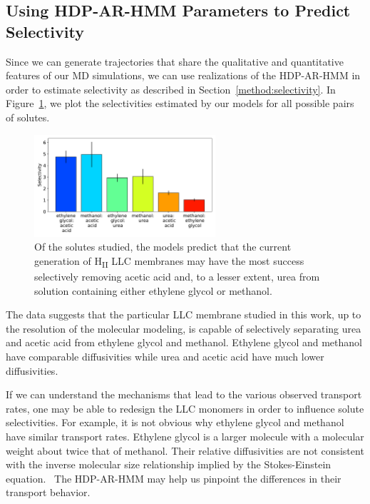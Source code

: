 \documentclass[journal=jpcbfk,manuscript=article]{achemso}
\begin{document}
  \subsection{Using HDP-AR-HMM Parameters to Predict Selectivity}\label{section:macroscopic_properties}
  
  Since we can generate trajectories that share the qualitative and quantitative
  features of our MD simulations, we can use realizations of the HDP-AR-HMM
  in order to estimate selectivity as described in Section~\ref{method:selectivity}.
  In Figure~\ref{fig:selectivity}, we plot the selectivities estimated by our
  models for all possible pairs of solutes.
  
  \begin{figure}
  \centering
  \includegraphics[width=0.6\textwidth]{selectivity.pdf}
  \caption{Of the solutes studied, 
  the models predict that 
  the current generation of H\textsubscript{II}
  LLC membranes may have the most success selectively removing acetic acid and,
  to a lesser extent, urea from solution containing either ethylene glycol or 
  methanol.
  }\label{fig:selectivity}
  \end{figure}

  The data suggests that the particular LLC membrane studied in this work, 
  up to the resolution of the molecular modeling, is capable of selectively 
  separating urea and acetic acid from ethylene glycol and methanol. Ethylene 
  glycol and methanol have comparable diffusivities while urea and acetic 
  acid have much lower diffusivities. 

  If we can understand the mechanisms that lead to the various observed transport
  rates, one may be able to redesign the LLC monomers in order to influence solute
  selectivities. For example, it is not obvious why ethylene glycol and methanol
  have similar transport rates. Ethylene glycol is a larger molecule with a 
  molecular weight about twice that of methanol. Their relative diffusivities are 
  not consistent with the inverse molecular size relationship implied by the 
  Stokes-Einstein equation.~\cite{gierer_molekulare_1953} The HDP-AR-HMM may 
  help us pinpoint the differences in their transport behavior.
  
\end{document}
